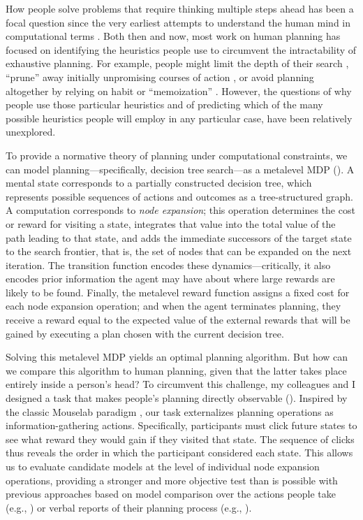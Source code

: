 \documentclass[dsingle]{memo}
\begin{document}
How people solve problems that require thinking multiple steps ahead has been a focal question since the very earliest attempts to understand the human mind in computational terms \citep{newell1956logic,newell1972human}. Both then and now, most work on human planning has focused on identifying the heuristics people use to circumvent the intractability of exhaustive planning. For example, people might limit the depth of their search \citep{macgregor2001information,keramati2016adaptive,krusche2018adaptive,snider2015prospective}, ``prune'' away initially unpromising courses of action \citep{huys2012bonsai,huys2015interplay}, or avoid planning altogether by relying on habit or ``memoization'' \citep{huys2015interplay,kool2017costbenefit}. However, the questions of why people use those particular heuristics and of predicting which of the many possible heuristics people will employ in any particular case, have been relatively unexplored.

To provide a normative theory of planning under computational constraints, we can model planning---specifically, decision tree search---as a metalevel MDP (). A mental state corresponds to a partially constructed decision tree, which represents possible sequences of actions and outcomes as a tree-structured graph. A computation corresponds to \emph{node expansion}; this operation determines the cost or reward for visiting a state, integrates that value into the total value of the path leading to that state, and adds the immediate successors of the target state to the search frontier, that is, the set of nodes that can be expanded on the next iteration. The transition function encodes these dynamics---critically, it also encodes prior information the agent may have about where large rewards are likely to be found. Finally, the metalevel reward function assigns a fixed cost for each node expansion operation; and when the agent terminates planning, they receive a reward equal to the expected value of the external rewards that will be gained by executing a plan chosen with the current decision tree.

Solving this metalevel MDP yields an optimal planning algorithm. But how can we compare this algorithm to human planning, given that the latter takes place entirely inside a person's head? To circumvent this challenge, my colleagues and I designed a task that makes people's planning directly observable (). Inspired by the classic Mouselab paradigm \citep{payne1988adaptive}, our task externalizes planning operations as information-gathering actions. Specifically, participants must click future states to see what reward they would gain if they visited that state. The sequence of clicks thus reveals the order in which the participant considered each state. This allows us to evaluate candidate models at the level of individual node expansion operations, providing a stronger and more objective test than is possible with previous approaches based on model comparison over the actions people take (e.g., \citealp{huys2015interplay,vanopheusden2017computational}) or verbal reports of their planning process (e.g., \citealp{degroot1965thought,newell1972human}).
\end{document}
